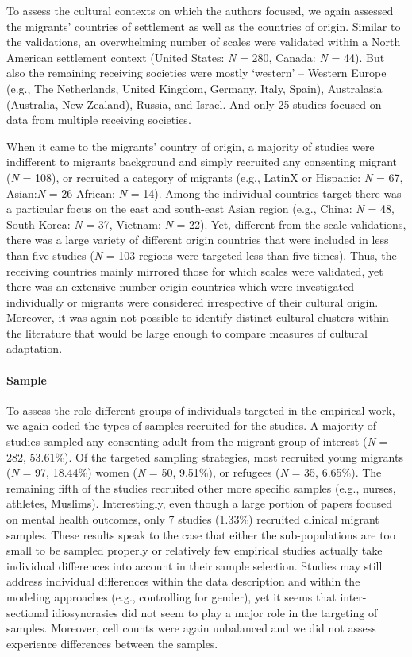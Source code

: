 To assess the cultural contexts on which the authors focused, we again
assessed the migrants' countries of settlement as well as the countries
of origin. Similar to the validations, an overwhelming number of scales
were validated within a North American settlement context (United
States: \textit{N} = 280, Canada: \textit{N} = 44). But also the
remaining receiving societies were mostly `western' -- Western Europe
(e.g., The Netherlands, United Kingdom, Germany, Italy, Spain),
Australasia (Australia, New Zealand), Russia, and Israel. And only 25
studies focused on data from multiple receiving societies.

When it came to the migrants' country of origin, a majority of studies
were indifferent to migrants background and simply recruited any
consenting migrant (\textit{N} = 108), or recruited a category of
migrants (e.g., LatinX or Hispanic: \textit{N} = 67, Asian:\textit{N} =
26 African: \textit{N} = 14). Among the individual countries target
there was a particular focus on the east and south-east Asian region
(e.g., China: \textit{N} = 48, South Korea: \textit{N} = 37, Vietnam:
\textit{N} = 22). Yet, different from the scale validations, there was a
large variety of different origin countries that were included in less
than five studies (\textit{N} = 103 regions were targeted less than five
times). Thus, the receiving countries mainly mirrored those for which
scales were validated, yet there was an extensive number origin
countries which were investigated individually or migrants were
considered irrespective of their cultural origin. Moreover, it was again
not possible to identify distinct cultural clusters within the
literature that would be large enough to compare measures of cultural
adaptation.

\paragraph{Sample}

To assess the role different groups of individuals targeted in the
empirical work, we again coded the types of samples recruited for the
studies. A majority of studies sampled any consenting adult from the
migrant group of interest (\textit{N} = 282, 53.61\%). Of the targeted
sampling strategies, most recruited young migrants (\textit{N} = 97,
18.44\%) women (\textit{N} = 50, 9.51\%), or refugees (\textit{N} = 35,
6.65\%). The remaining fifth of the studies recruited other more
specific samples (e.g., nurses, athletes, Muslims). Interestingly, even
though a large portion of papers focused on mental health outcomes, only
7 studies (1.33\%) recruited clinical migrant samples. These results
speak to the case that either the sub-populations are too small to be
sampled properly or relatively few empirical studies actually take
individual differences into account in their sample selection. Studies
may still address individual differences within the data description and
within the modeling approaches (e.g., controlling for gender), yet it
seems that inter-sectional idiosyncrasies did not seem to play a major
role in the targeting of samples. Moreover, cell counts were again
unbalanced and we did not assess experience differences between the
samples.

